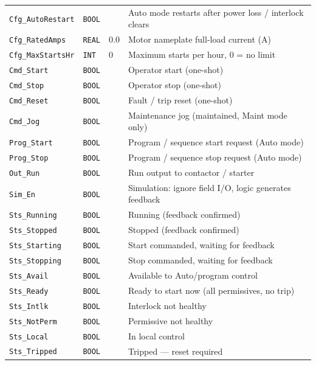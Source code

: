 \begin{small}
\begin{longtable}{@{}P{3.70cm}P{2.20cm}P{1.70cm}P{8.91cm}@{}}
\texttt{Cfg\_AutoRestart} & \texttt{BOOL} &  & Auto mode restarts after power loss /\allowbreak{} interlock clears \\
\texttt{Cfg\_RatedAmps} & \texttt{REAL} & 0.0 & Motor nameplate full-load current (A) \\
\texttt{Cfg\_MaxStartsHr} & \texttt{INT} & 0 & Maximum starts per hour, 0 = no limit \\
\texttt{Cmd\_Start} & \texttt{BOOL} &  & Operator start (one-shot) \\
\texttt{Cmd\_Stop} & \texttt{BOOL} &  & Operator stop (one-shot) \\
\texttt{Cmd\_Reset} & \texttt{BOOL} &  & Fault /\allowbreak{} trip reset (one-shot) \\
\texttt{Cmd\_Jog} & \texttt{BOOL} &  & Maintenance jog (maintained, Maint mode only) \\
\texttt{Prog\_Start} & \texttt{BOOL} &  & Program /\allowbreak{} sequence start request (Auto mode) \\
\texttt{Prog\_Stop} & \texttt{BOOL} &  & Program /\allowbreak{} sequence stop request (Auto mode) \\
\texttt{Out\_Run} & \texttt{BOOL} &  & Run output to contactor /\allowbreak{} starter \\
\texttt{Sim\_En} & \texttt{BOOL} &  & Simulation: ignore field I/\allowbreak{}O, logic generates feedback \\
\texttt{Sts\_Running} & \texttt{BOOL} &  & Running (feedback confirmed) \\
\texttt{Sts\_Stopped} & \texttt{BOOL} &  & Stopped (feedback confirmed) \\
\texttt{Sts\_Starting} & \texttt{BOOL} &  & Start commanded, waiting for feedback \\
\texttt{Sts\_Stopping} & \texttt{BOOL} &  & Stop commanded, waiting for feedback \\
\texttt{Sts\_Avail} & \texttt{BOOL} &  & Available to Auto/\allowbreak{}program control \\
\texttt{Sts\_Ready} & \texttt{BOOL} &  & Ready to start now (all permissives, no trip) \\
\texttt{Sts\_Intlk} & \texttt{BOOL} &  & Interlock not healthy \\
\texttt{Sts\_NotPerm} & \texttt{BOOL} &  & Permissive not healthy \\
\texttt{Sts\_Local} & \texttt{BOOL} &  & In local control \\
\texttt{Sts\_Tripped} & \texttt{BOOL} &  & Tripped --- reset required \\

\end{longtable}
\end{small}
